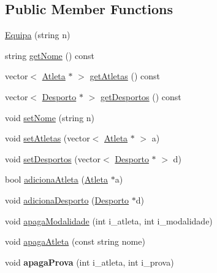 \subsection*{Public Member Functions}
\begin{DoxyCompactItemize}
\item 
\hyperlink{class_equipa_aa318e7b925bfed173bb90d20c63d8a43}{Equipa} (string n)
\item 
string \hyperlink{class_equipa_a9d20d0c8daa94e7562c5ea173337a224}{get\+Nome} () const 
\item 
vector$<$ \hyperlink{class_atleta}{Atleta} $\ast$ $>$ \hyperlink{class_equipa_a24c4de83cc1171ce42f442ef7be8a7c4}{get\+Atletas} () const 
\item 
vector$<$ \hyperlink{class_desporto}{Desporto} $\ast$ $>$ \hyperlink{class_equipa_a6b6996a193cea733caafb99d0ddebbcc}{get\+Desportos} () const 
\item 
void \hyperlink{class_equipa_a0e9f300d552f0c4de6fc28d555141eb5}{set\+Nome} (string n)
\item 
void \hyperlink{class_equipa_a3269b5a8f6c3ebc9370c4cdf004c0b31}{set\+Atletas} (vector$<$ \hyperlink{class_atleta}{Atleta} $\ast$ $>$ a)
\item 
void \hyperlink{class_equipa_ae94bfeafedcf21a1d85db42a7f60b4ea}{set\+Desportos} (vector$<$ \hyperlink{class_desporto}{Desporto} $\ast$ $>$ d)
\item 
bool \hyperlink{class_equipa_a18b0bb0b40831afda4d8baa0730dc40f}{adiciona\+Atleta} (\hyperlink{class_atleta}{Atleta} $\ast$a)
\item 
void \hyperlink{class_equipa_a22daef4c32fcc25228a113a134911565}{adiciona\+Desporto} (\hyperlink{class_desporto}{Desporto} $\ast$d)
\item 
void \hyperlink{class_equipa_a0ff737879e2ece8397d01d1da745a788}{apaga\+Modalidade} (int i\+\_\+atleta, int i\+\_\+modalidade)
\item 
void \hyperlink{class_equipa_a400bfd580a01c9999de6fd204a4a5eef}{apaga\+Atleta} (const string nome)
\item 
\hypertarget{class_equipa_a49777ca3555eeb24015cb174dcb3f0dc}{}void {\bfseries apaga\+Prova} (int i\+\_\+atleta, int i\+\_\+prova)\label{class_equipa_a49777ca3555eeb24015cb174dcb3f0dc}


\end{DoxyCompactItemize}

